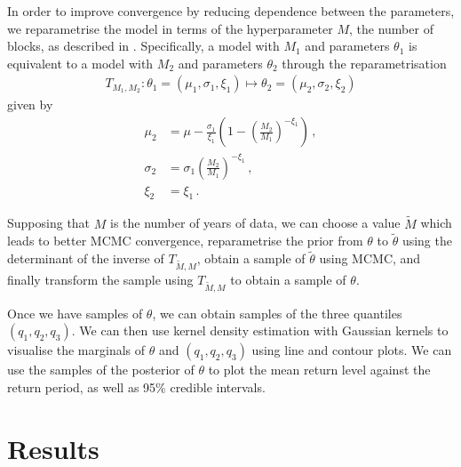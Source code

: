 \documentclass{article}
\begin{document}
%
In order to improve convergence
by reducing dependence between the parameters,
we reparametrise the model in terms of the hyperparameter $M$,
the number of blocks,
as described in \cite{sharkey2017}.
Specifically,
a model with $M_1$ and parameters $\theta_1$
is equivalent to a model with
$M_2$ and parameters $\theta_2$ through
the reparametrisation
%
\begin{align}
	T_{M_1, M_2} \colon \theta_1 = (\mu_1, \sigma_1, \xi_1)
		\mapsto \theta_2 = (\mu_2, \sigma_2, \xi_2)
	\label{eq:M-repara}
\end{align}
%
given by
%
\begin{align*}
	\mu_2 &= \mu - \frac{\sigma_1}{\xi_1}
		\left( 1 - \left(\frac{M_2}{M_1}\right) ^ {-\xi_1} \right)
		\,, \\
	\sigma_2 &= \sigma_1 \left(\frac{M_2}{M_1}\right) ^ {-\xi_1}
		\,, \\
	\xi_2 & = \xi_1 \,.
\end{align*}
%

%
Supposing that $M$ is the number of years of data,
we can choose a value $\tilde{M}$ which
leads to better MCMC convergence,
reparametrise the prior from 
$\theta$ to $\tilde{\theta}$
using the determinant of the inverse of
$T_{\tilde{M}, M}$,
obtain a sample of $\tilde{\theta}$ using MCMC,
and finally transform the sample using $T_{\tilde{M}, M}$
to obtain a sample of $\theta$.

%
Once we have samples of $\theta$,
we can obtain samples of the three quantiles \\
$(q_1, q_2, q_3)$. We can then use kernel density estimation
with Gaussian kernels to visualise the marginals of
$\theta$ and $(q_1, q_2, q_3)$
using line and contour plots.
We can use the samples of the posterior of $\theta$
to plot the mean return level against the return period,
as well as 95\% credible intervals.
%
\section{Results}
\label{section:studies}
%
\end{document}
